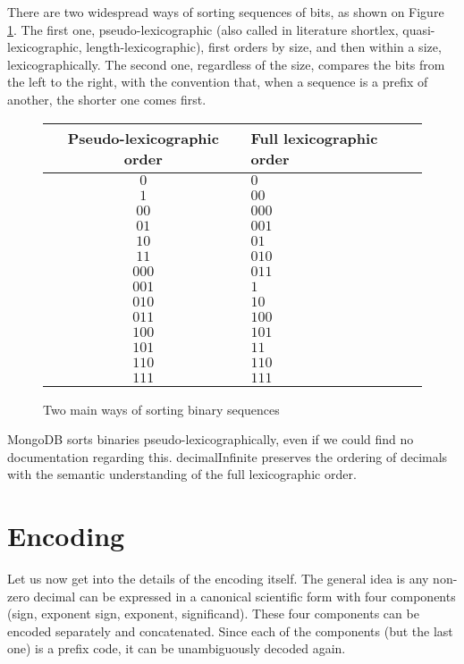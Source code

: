 \documentclass{acm_proc_article-sp}
\begin{document}
There are two widespread ways of sorting sequences of bits, as shown on Figure \ref{figure-orders}. The first one, pseudo-lexicographic (also called in literature shortlex, quasi-lexicographic, length-lexicographic), first orders by size, and then within a size, lexicographically. The second one, regardless of the size, compares the bits from the left to the right, with the convention that, when a sequence is a prefix of another, the shorter one comes first.

\begin{figure}
\caption{Two main ways of sorting binary sequences}
\label{figure-orders}
\center
\begin{tabular}{|c|l|}
\hline
Pseudo-lexicographic order & Full lexicographic order\\
\hline
$0$ & $0$ \\
$1$ & $00$ \\
$00$ & $000$ \\
$01$ & $001$ \\
$10$ & $01$ \\
$11$ & $010$ \\
$000$ & $011$ \\
$001$ & $1$ \\
$010$ & $10$ \\
$011$ & $100$ \\
$100$ & $101$ \\
$101$ & $11$ \\
$110$ & $110$ \\
$111$ & $111$ \\
\hline
\end{tabular}
\end{figure}

MongoDB sorts binaries pseudo-lexicographically, even if we could find no documentation regarding this. decimalInfinite preserves the ordering of decimals with the semantic understanding of the full lexicographic order.

\section{Encoding}
\label{section-encoding}
Let us now get into the details of the encoding itself. The general idea is any non-zero decimal can be expressed in a canonical scientific form with four components (sign, exponent sign, exponent, significand). These four components can be encoded separately and concatenated. Since each of the components (but the last one) is a prefix code, it can be unambiguously decoded again.
\end{document}
